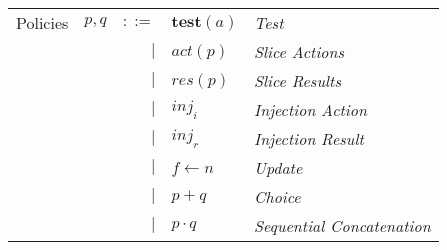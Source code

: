 \documentclass[12pt, letterpaper]{article}
\begin{document}
    \begin{tabular}{l c r l l}
        Policies    & $p,q$ & $::=$  & $\mathbf{test}(a)$ & \textit{Test}     \\
                    &       & $\mid$ & $act(p)$         & \textit{Slice Actions}    \\
                    &       & $\mid$ & $res(p)$         & \textit{Slice Results}    \\
                    &       & $\mid$ & $inj_{i}$        & \textit{Injection Action} \\
                    &       & $\mid$ & $inj_{r}$        & \textit{Injection Result} \\
                    &       & $\mid$ & $f \leftarrow n$ & \textit{Update}   \\
                    &       & $\mid$ & $p + q$          & \textit{Choice}   \\
                    &       & $\mid$ & $p \cdot q$      & \textit{Sequential Concatenation}
    \end{tabular}\\


\end{document}
